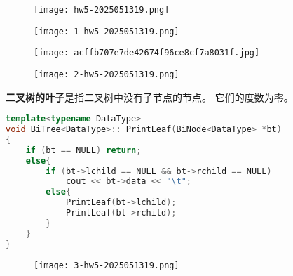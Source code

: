 \begin{figure}[H]
\centering
\texttt{[image: hw5-2025051319.png]}
\label{}
\end{figure}

\begin{figure}[H]
\centering
\texttt{[image: 1-hw5-2025051319.png]}
\label{}
\end{figure}

\begin{figure}[H]
\centering
\texttt{[image: acffb707e7de42674f96ce8cf7a8031f.jpg]}
\label{}
\end{figure}
\begin{figure}[H]
\centering
\texttt{[image: 2-hw5-2025051319.png]}
\label{}
\end{figure}

\textbf{二叉树的叶子}是指二叉树中没有子节点的节点。 它们的度数为零。

\begin{lstlisting}[language=C++]
template<typename DataType>
void BiTree<DataType>:: PrintLeaf(BiNode<DataType> *bt)
{
    if (bt == NULL) return;
    else{
        if (bt->lchild == NULL && bt->rchild == NULL) 
            cout << bt->data << "\t";
        else{
            PrintLeaf(bt->lchild);
            PrintLeaf(bt->rchild);
        }
    }
}
\end{lstlisting}
\begin{figure}[H]
\centering
\texttt{[image: 3-hw5-2025051319.png]}
\label{}
\end{figure}

